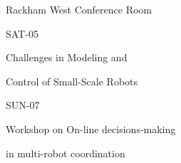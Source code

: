 \documentclass{article}
\begin{document}
\rssheader[1in]

\fontsize{32pt}{36pt}
\selectfont
\begin{center}
Rackham West Conference Room
\end{center}

\vfill

\fontsize{48pt}{56pt}
\selectfont
\begin{center}
SAT-05
\end{center}

\fontsize{24pt}{28pt}
\selectfont
\begin{center}
Challenges in Modeling and \par \noindent Control of Small-Scale Robots
\end{center}

\vfill

\fontsize{48pt}{56pt}
\selectfont
\begin{center}
SUN-07
\end{center}

\fontsize{24pt}{24pt}
\selectfont
\begin{center}
Workshop on On-line decisions-making \par \noindent in multi-robot coordination
\end{center}

\vfill
\end{document}
